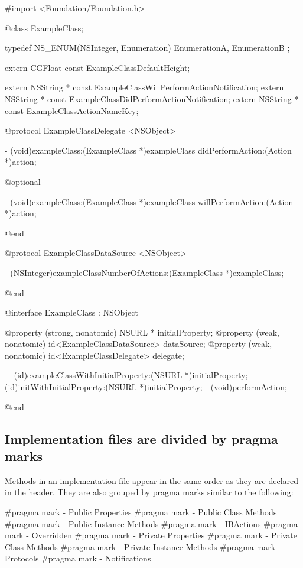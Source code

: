 \documentclass[10pt]{extarticle}
\begin{document}
\begin{codelisting}
#import <Foundation/Foundation.h>

@class ExampleClass;


typedef NS_ENUM(NSInteger, Enumeration) {
    EnumerationA,
    EnumerationB
};

extern CGFloat const ExampleClassDefaultHeight;

extern NSString * const ExampleClassWillPerformActionNotification;
extern NSString * const ExampleClassDidPerformActionNotification;
extern NSString * const ExampleClassActionNameKey;


@protocol ExampleClassDelegate <NSObject>

- (void)exampleClass:(ExampleClass *)exampleClass didPerformAction:(Action *)action;

@optional

- (void)exampleClass:(ExampleClass *)exampleClass willPerformAction:(Action *)action;

@end


@protocol ExampleClassDataSource <NSObject>

- (NSInteger)exampleClassNumberOfActions:(ExampleClass *)exampleClass;

@end


@interface ExampleClass : NSObject

@property (strong, nonatomic) NSURL * initialProperty;
@property (weak, nonatomic) id<ExampleClassDataSource> dataSource;
@property (weak, nonatomic) id<ExampleClassDelegate> delegate;

+ (id)exampleClassWithInitialProperty:(NSURL *)initialProperty;
- (id)initWithInitialProperty:(NSURL *)initialProperty;
- (void)performAction;

@end
\end{codelisting}


\subsection{Implementation files are divided by pragma marks}

Methods in an implementation file appear in the same order as they are declared in the header. They are also grouped by pragma marks similar to the following:

\begin{codelisting}
#pragma mark - Public Properties
#pragma mark - Public Class Methods
#pragma mark - Public Instance Methods
#pragma mark - IBActions
#pragma mark - Overridden
#pragma mark - Private Properties
#pragma mark - Private Class Methods
#pragma mark - Private Instance Methods
#pragma mark - Protocols
#pragma mark - Notifications
\end{codelisting}
\end{document}

